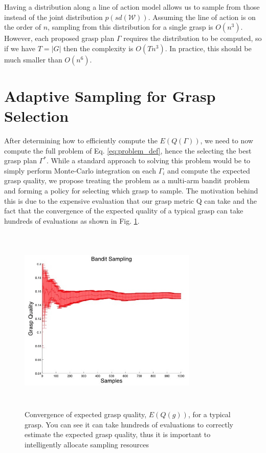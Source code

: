 \documentclass[letterpaper, 10 pt, conference]{ieeeconf}  %
\begin{document}
Having a distribution along a line of action model allows us to sample from those instead of the joint distribution $p(sd(\mathcal{W}))$. Assuming the line of action is on the order of $n$, sampling from this distribution for a single grasp is $O(n^3)$. However, each proposed grasp plan $\Gamma$ requires the distribution to be computed, so if we have $T=|G|$ then the complexity is $O(Tn^3)$. In practice, this should be much smaller than $O(n^6)$. 

\section{Adaptive Sampling for Grasp Selection}
After determining how to efficiently compute the $E(Q(\Gamma))$, we need to now compute the full problem of Eq. \ref{eq:problem_def}, hence the selecting the best grasp plan $\Gamma^*$. While a standard approach to solving this problem would be to simply perform Monte-Carlo integration on each $\Gamma_i$ and compute the expected grasp quality, we propose treating the problem as a multi-arm bandit problem and forming a policy for selecting which grasp to sample. The motivation behind this is due to the expensive evaluation that our grasp metric Q can take \cite{ferrari1992} and the fact that the convergence of the expected quality of a typical grasp can take hundreds of evaluations as shown in Fig. \ref{fig:sampling_convergence}. 

\begin{figure}[ht!]
\centering
\includegraphics[width=8.5cm,height=9cm]{figures/Slide11.jpg}
\caption{ \footnotesize Convergence of expected grasp quality, $E(Q(g))$,  for a typical grasp. You can see it can take hundreds of evaluations to correctly estimate the expected grasp quality, thus it is important to  intelligently allocate sampling resources}
\vspace*{-10pt}
\label{fig:sampling_convergence}
\end{figure}
\end{document}
